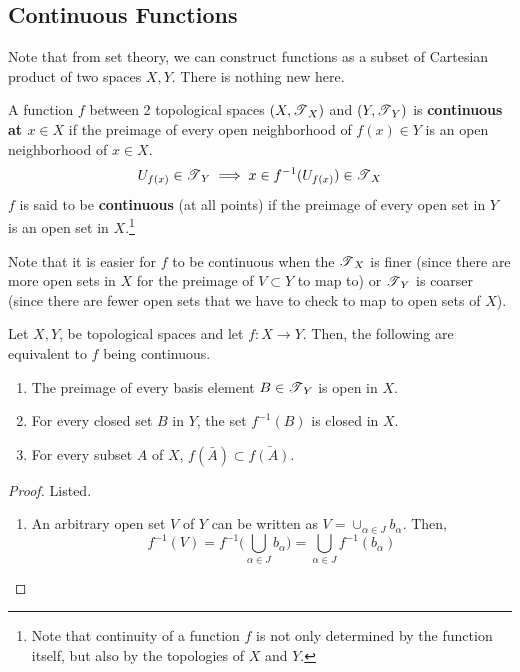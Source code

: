 \subsection{Continuous Functions}

  Note that from set theory, we can construct functions as a subset of Cartesian product of two spaces $X, Y$. There is nothing new here. 

  \begin{definition}
    A function $f$ between 2 topological spaces $(X, \operatorname{\mathscr{T}}_{X})$ and $(Y, \operatorname{\mathscr{T}}_{Y})$ is \textbf{continuous at $x \in X$} if the preimage of every open neighborhood of $f(x) \in Y$ is an open neighborhood of $x \in X$.
    \begin{equation}
      U_{f(x)} \in \operatorname{\mathscr{T}}_{Y} \implies x \in f^{-1}(U_{f(x)}) \in \operatorname{\mathscr{T}}_{X}
    \end{equation} 
    $f$ is said to be \textbf{continuous} (at all points) if the preimage of every open set in $Y$ is an open set in $X$.\footnote{Note that continuity of a function $f$ is not only determined by the function itself, but also by the topologies of $X$ and $Y$.}
  \end{definition}

  Note that it is easier for $f$ to be continuous when the $\operatorname{\mathscr{T}}_X$ is finer (since there are more open sets in $X$ for the preimage of $V \subset Y$ to map to) or $\operatorname{\mathscr{T}}_Y$ is coarser (since there are fewer open sets that we have to check to map to open sets of $X$). 

  \begin{theorem}
    Let $X, Y$, be topological spaces and let $f: X \longrightarrow Y$. Then, the following are equivalent to $f$ being continuous. 
    \begin{enumerate}
      \item The preimage of every basis element $B \in \operatorname{\mathscr{T}}_Y$ is open in $X$. 
      \item For every closed set $B$ in $Y$, the set $f^{-1} (B)$ is closed in $X$. 
      \item For every subset $A$ of $X$, $f(\bar{A}) \subset \bar{f(A)}$. 
    \end{enumerate}
  \end{theorem}  
  \begin{proof}
    Listed. 
    \begin{enumerate}
      \item An arbitrary open set $V$ of $Y$ can be written as $V = \cup_{\alpha \in J} b_\alpha$. Then, 
      \begin{equation}
        f^{-1} (V) = f^{-1} \Big( \bigcup_{\alpha \in J} b_\alpha \Big) = \bigcup_{\alpha \in J} f^{-1} (b_\alpha)
      \end{equation}
    \end{enumerate}
  \end{proof}

